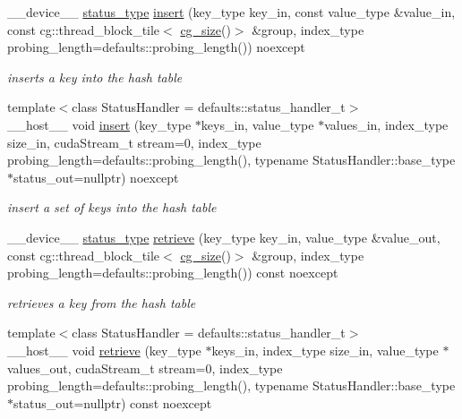 \begin{DoxyCompactItemize}
\+\_\+\+\_\+device\+\_\+\+\_\+ \hyperlink{classwarpcore_1_1Status}{status\+\_\+type} \hyperlink{classwarpcore_1_1SingleValueHashTable_ad7a6dfc1bef70e3c7aa02de3a684599a}{insert} (key\+\_\+type key\+\_\+in, const value\+\_\+type \&value\+\_\+in, const cg\+::thread\+\_\+block\+\_\+tile$<$ \hyperlink{classwarpcore_1_1SingleValueHashTable_aaa4cf7e3252a0b177101fca437e5309e}{cg\+\_\+size}()$>$ \&group, index\+\_\+type probing\+\_\+length=defaults\+::probing\+\_\+length()) noexcept
\begin{DoxyCompactList}\small\item\em inserts a key into the hash table \end{DoxyCompactList}\item 
{\footnotesize template$<$class Status\+Handler  = defaults\+::status\+\_\+handler\+\_\+t$>$ }\\\+\_\+\+\_\+host\+\_\+\+\_\+ void \hyperlink{classwarpcore_1_1SingleValueHashTable_a2beb03a7c71fe4b060c3fca482a8af1c}{insert} (key\+\_\+type $\ast$keys\+\_\+in, value\+\_\+type $\ast$values\+\_\+in, index\+\_\+type size\+\_\+in, cuda\+Stream\+\_\+t stream=0, index\+\_\+type probing\+\_\+length=defaults\+::probing\+\_\+length(), typename Status\+Handler\+::base\+\_\+type $\ast$status\+\_\+out=nullptr) noexcept
\begin{DoxyCompactList}\small\item\em insert a set of keys into the hash table \end{DoxyCompactList}\item 
\+\_\+\+\_\+device\+\_\+\+\_\+ \hyperlink{classwarpcore_1_1Status}{status\+\_\+type} \hyperlink{classwarpcore_1_1SingleValueHashTable_a6dd2ebec90629a6501d1d8a4bab279a8}{retrieve} (key\+\_\+type key\+\_\+in, value\+\_\+type \&value\+\_\+out, const cg\+::thread\+\_\+block\+\_\+tile$<$ \hyperlink{classwarpcore_1_1SingleValueHashTable_aaa4cf7e3252a0b177101fca437e5309e}{cg\+\_\+size}()$>$ \&group, index\+\_\+type probing\+\_\+length=defaults\+::probing\+\_\+length()) const noexcept
\begin{DoxyCompactList}\small\item\em retrieves a key from the hash table \end{DoxyCompactList}\item 
{\footnotesize template$<$class Status\+Handler  = defaults\+::status\+\_\+handler\+\_\+t$>$ }\\\+\_\+\+\_\+host\+\_\+\+\_\+ void \hyperlink{classwarpcore_1_1SingleValueHashTable_ad9bb1950004ed390a9f1ec4e141e4276}{retrieve} (key\+\_\+type $\ast$keys\+\_\+in, index\+\_\+type size\+\_\+in, value\+\_\+type $\ast$values\+\_\+out, cuda\+Stream\+\_\+t stream=0, index\+\_\+type probing\+\_\+length=defaults\+::probing\+\_\+length(), typename Status\+Handler\+::base\+\_\+type $\ast$status\+\_\+out=nullptr) const noexcept

\end{DoxyCompactItemize}

